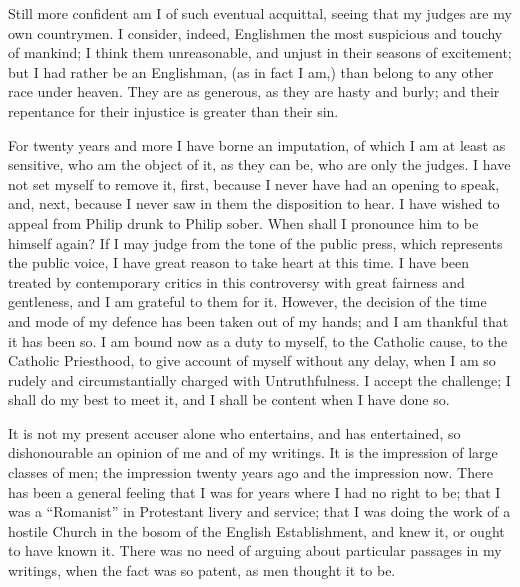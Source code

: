 Still more confident am I of such eventual acquittal, seeing that
my judges are my own countrymen. I consider, indeed, Englishmen the most suspicious and touchy of mankind;
I think them unreasonable, and unjust in their seasons of
excitement; but I had rather be an Englishman, (as in fact I am,) than
belong to any other race under heaven. They are as generous, as they
are hasty and burly; and their repentance for their injustice is
greater than their sin.

For twenty years and more I have borne an imputation, of which I am
at least as sensitive, who am the object of it, as they can be, who
are only the judges. I have not set myself to remove it, first,
because I never have had an opening to speak, and, next, because I
never saw in them the disposition to hear. I have wished to appeal
from Philip drunk to Philip sober. When shall I pronounce him to be
himself again? If I may judge from the tone of the public press, which
represents the public voice, I have great reason to take heart at this
time. I have been treated by contemporary critics in this controversy
with great fairness and gentleness, and I am grateful to them for it.
However, the decision of the time and mode of my defence has been
taken out of my hands; and I am thankful that it has been so. I am
bound now as a duty to myself, to the Catholic cause, to the Catholic
Priesthood, to give account of myself without any delay, when I am so
rudely and circumstantially charged with Untruthfulness. I accept the
challenge; I shall do my best to meet it, and I shall be content when
I have done so.

It is not my present accuser alone
who entertains, and has entertained, so dishonourable an opinion of me and
of my writings. It is the
impression of large classes of men; the impression twenty years ago
and the impression now. There has been a general feeling that I was
for years where I had no right to be; that I was a
``Romanist'' in Protestant livery and service; that I was
doing the work of a hostile Church in the bosom of the English
Establishment, and knew it, or ought to have known it. There was no
need of arguing about particular passages in my writings, when the
fact was so patent, as men thought it to be.

